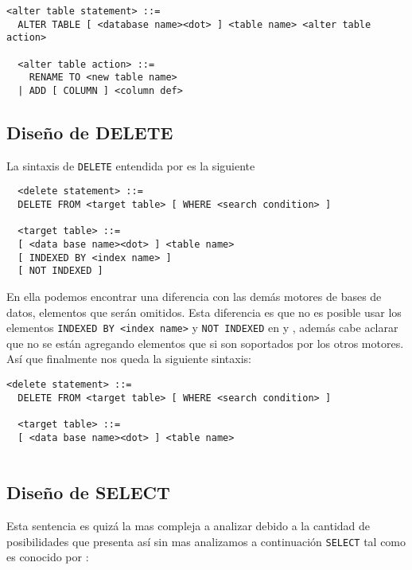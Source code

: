 %  
\begin{Verbatim}[frame=single, label=sintaxis para ALTER TABLE]
<alter table statement> ::= 
  ALTER TABLE [ <database name><dot> ] <table name> <alter table action>
  
  <alter table action> ::=
    RENAME TO <new table name>
  | ADD [ COLUMN ] <column def>
\end{Verbatim}




\subsection{Diseño de DELETE}
La sintaxis de \verb=DELETE= entendida por \s es la siguiente
\begin{Verbatim}
  <delete statement> ::=
  DELETE FROM <target table> [ WHERE <search condition> ]

  <target table> ::=
  [ <data base name><dot> ] <table name>
  [ INDEXED BY <index name> ]
  [ NOT INDEXED ]
\end{Verbatim}
En ella podemos encontrar una diferencia con las demás motores de bases de datos, elementos que serán omitidos. Esta diferencia es que no es posible usar los elementos \verb=INDEXED BY <index name>= y \verb=NOT INDEXED= en \p y \m, además cabe aclarar que no se están agregando elementos que si son soportados por los otros motores. Así que finalmente nos queda la siguiente sintaxis:


\begin{Verbatim}[frame=single, label=sintaxis para DELETE]
  <delete statement> ::=
  DELETE FROM <target table> [ WHERE <search condition> ]
  
  <target table> ::=
  [ <data base name><dot> ] <table name>
  
\end{Verbatim}




\subsection{Diseño de SELECT}
Esta sentencia es quizá la mas compleja a analizar debido a la cantidad de posibilidades que presenta así sin mas analizamos a continuación \verb=SELECT= tal como es conocido por \s:

